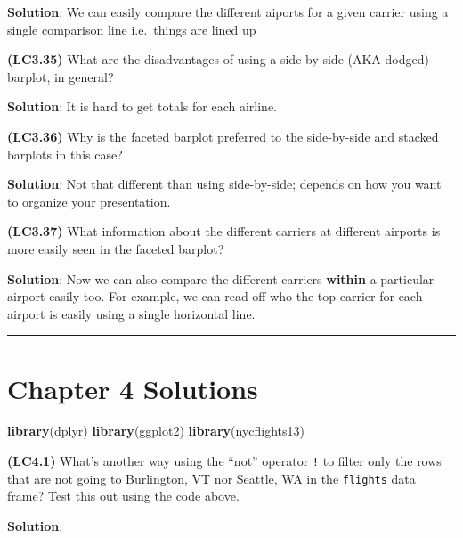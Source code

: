 \documentclass[12pt, krantz2,]{krantz}
\makeatletter
\newenvironment{Shaded}{\begin{snugshade}}{\end{snugshade}}
\newcommand{\KeywordTok}[1]{\textcolor[rgb]{0.27,0.27,0.27}{\textbf{#1}}}
\newcommand{\NormalTok}[1]{#1}
\newenvironment{kframe}{%
\medskip{}
\setlength{\fboxsep}{.8em}
 \def\at@end@of@kframe{}%
 \ifinner\ifhmode%
  \def\at@end@of@kframe{\end{minipage}}%
  \begin{minipage}{\columnwidth}%
 \fi\fi%
 \def\FrameCommand##1{\hskip\@totalleftmargin \hskip-\fboxsep
 \colorbox{shadecolor}{##1}\hskip-\fboxsep
     \hskip-\linewidth \hskip-\@totalleftmargin \hskip\columnwidth}%
 \MakeFramed {\advance\hsize-\width
   \@totalleftmargin\z@ \linewidth\hsize
   \@setminipage}}%
 {\par\unskip\endMakeFramed%
 \at@end@of@kframe}
\renewenvironment{Shaded}{\begin{kframe}}{\end{kframe}}
\makeatother
\begin{document}
\textbf{Solution}: We can easily compare the different aiports for a given carrier using a single comparison line i.e.~things are lined up

\textbf{(LC3.35)} What are the disadvantages of using a side-by-side (AKA dodged) barplot, in general?

\textbf{Solution}: It is hard to get totals for each airline.

\textbf{(LC3.36)} Why is the faceted barplot preferred to the side-by-side and stacked barplots in this case?

\textbf{Solution}: Not that different than using side-by-side; depends on how you want to organize your presentation.

\textbf{(LC3.37)} What information about the different carriers at different airports is more easily seen in the faceted barplot?

\textbf{Solution}: Now we can also compare the different carriers \textbf{within} a particular airport easily too. For example, we can read off who the top carrier for each airport is easily using a single horizontal line.

\begin{center}\rule{0.5\linewidth}{\linethickness}\end{center}

\hypertarget{chapter-4-solutions}{%
\section{Chapter 4 Solutions}\label{chapter-4-solutions}}

\begin{Shaded}
\begin{Highlighting}[]
\KeywordTok{library}\NormalTok{(dplyr)}
\KeywordTok{library}\NormalTok{(ggplot2)}
\KeywordTok{library}\NormalTok{(nycflights13)}
\end{Highlighting}
\end{Shaded}

\textbf{(LC4.1)} What's another way using the ``not'' operator \texttt{!} to filter only the rows that are not going to Burlington, VT nor Seattle, WA in the \texttt{flights} data frame? Test this out using the code above.

\textbf{Solution}:
\end{document}

